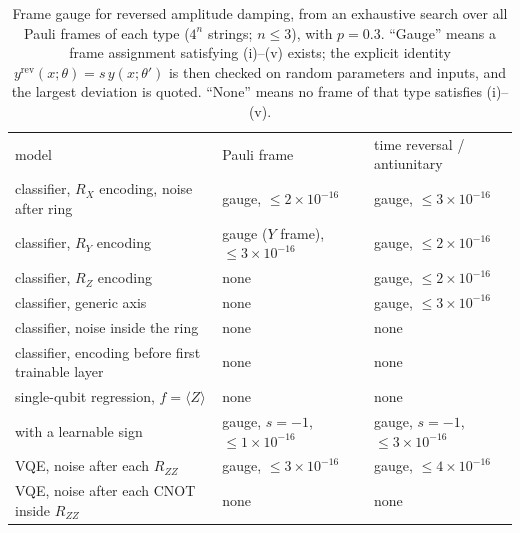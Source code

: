 \begin{table}[t]
\caption{Frame gauge for reversed amplitude damping, from an exhaustive search over all
Pauli frames of each type ($4^n$ strings; $n\le3$), with $p=0.3$. ``Gauge'' means a frame
assignment satisfying (i)--(v) exists; the explicit identity
$y^{\mathrm{rev}}(x;\theta)=s\,y(x;\theta')$ is then checked on random parameters and inputs, and
the largest deviation is quoted. ``None'' means no frame of that type satisfies (i)--(v).}
\label{tab:gauge}
\begin{ruledtabular}
\begin{tabular}{lll}
model & Pauli frame & time reversal / antiunitary\\
\colrule
classifier, $R_X$ encoding, noise after ring  & gauge, $\le2\times10^{-16}$ & gauge, $\le3\times10^{-16}$\\
classifier, $R_Y$ encoding                     & gauge ($Y$ frame), $\le3\times10^{-16}$ & gauge, $\le2\times10^{-16}$\\
classifier, $R_Z$ encoding                     & none       & gauge, $\le2\times10^{-16}$\\
classifier, generic axis                       & none       & gauge, $\le3\times10^{-16}$\\
classifier, noise inside the ring              & none       & none\\
classifier, encoding before first trainable layer & none    & none\\
single-qubit regression, $f=\langle Z\rangle$  & none       & none\\
\quad with a learnable sign                    & gauge, $s=-1$, $\le1\times10^{-16}$ & gauge, $s=-1$, $\le3\times10^{-16}$\\
VQE, noise after each $R_{ZZ}$                 & gauge, $\le3\times10^{-16}$ & gauge, $\le4\times10^{-16}$\\
VQE, noise after each CNOT inside $R_{ZZ}$     & none       & none\\
\end{tabular}
\end{ruledtabular}
\end{table}


